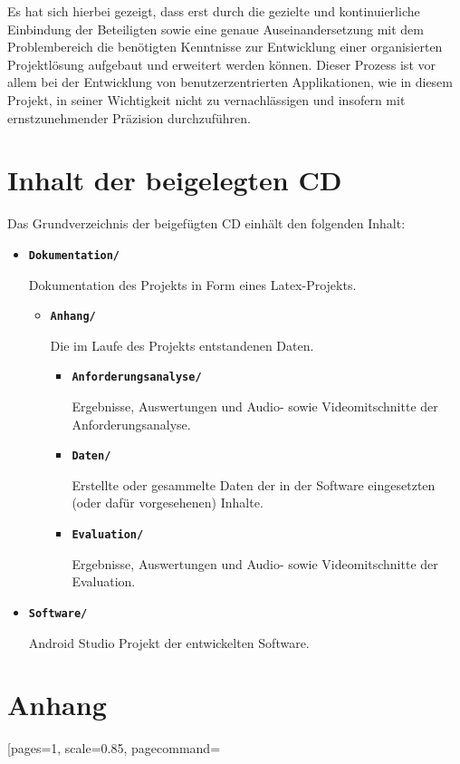 \documentclass[bibliography=totoc,listof=totoc,BCOR=5mm,DIV=12,oneside]{scrbook}
\begin{document}
{\par \bigskip Es hat sich hierbei gezeigt, dass erst durch die gezielte und kontinuierliche Einbindung der Beteiligten sowie eine genaue Auseinandersetzung mit dem Problembereich die benötigten Kenntnisse zur Entwicklung einer organisierten Projektlösung aufgebaut und erweitert werden können. Dieser Prozess ist vor allem bei der Entwicklung von \grqq benutzerzentrierten \grqq{} Applikationen, wie in diesem Projekt, in seiner Wichtigkeit nicht zu vernachlässigen und  insofern mit ernstzunehmender Präzision durchzuführen.
\listoffigures
\listoftables
\lstlistoflistings


\chapter*{Inhalt der beigelegten CD}
\par Das Grundverzeichnis der beigefügten CD einhält den folgenden Inhalt:

\begin{itemize}
\item[] \textbf{\texttt{Dokumentation/}}
\par Dokumentation des Projekts in Form eines Latex-Projekts.
\begin{itemize}
\item[] \textbf{\texttt{Anhang/}}
\par Die im Laufe des Projekts entstandenen Daten.
	\begin{itemize}
		\item[] \textbf{\texttt{Anforderungsanalyse/}}
		\par Ergebnisse, Auswertungen und Audio- sowie Videomitschnitte der Anforderungsanalyse.
		\item[] \textbf{\texttt{Daten/}}
		\par Erstellte oder gesammelte Daten der in der Software eingesetzten (oder dafür vorgesehenen) Inhalte.
		\item[] \textbf{\texttt{Evaluation/}}
		\par Ergebnisse, Auswertungen und Audio- sowie Videomitschnitte der Evaluation.
	\end{itemize}
\end{itemize}
\item[] \textbf{\texttt{Software/}}
\par Android Studio Projekt der entwickelten Software.
\end{itemize}


\appendix

\chapter{Anhang}
[pages=1, scale=0.85, pagecommand=
}
\end{document}
